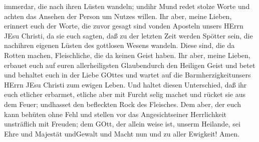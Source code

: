 immerdar, die nach ihren Lüsten wandeln; undihr Mund redet stolze Worte
und achten das Ansehen der Person um Nutzes willen.  Ihr
aber, meine Lieben, erinnert euch der Worte, die zuvor gesagt sind
vonden Aposteln unsers HErrn JEsu Christi,  da sie euch
sagten, daß zu der letzten Zeit werden Spötter sein, die nachihren
eigenen Lüsten des gottlosen Wesens wandeln.  Diese sind,
die da Rotten machen, Fleischliche, die da keinen Geist haben.
 Ihr aber, meine Lieben, erbauet euch auf euren
allerheiligsten Glaubendurch den Heiligen Geist und betet 
und behaltet euch in der Liebe GOttes und wartet auf die
Barmherzigkeitunsers HErrn JEsu Christi zum ewigen Leben. 
Und haltet diesen Unterschied, daß ihr euch etlicher erbarmet,
 etliche aber mit Furcht selig machet und rücket sie aus
dem Feuer; undhasset den befleckten Rock des Fleisches. 
Dem aber, der euch kann behüten ohne Fehl und stellen vor das
Angesichtseiner Herrlichkeit unsträflich mit Freuden;  dem
GOtt, der allein weise ist, unserm Heilande, sei Ehre und Majestät
undGewalt und Macht nun und zu aller Ewigkeit! Amen.
